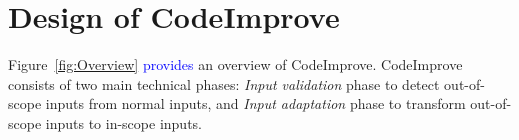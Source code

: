 \section{Design of CodeImprove}






Figure~\ref{fig:Overview} \textcolor{blue}{provides} an overview of CodeImprove. 
CodeImprove consists of two main technical phases: \textit{Input validation} phase to detect out-of-scope inputs from normal inputs, and \textit{Input adaptation} phase to transform out-of-scope inputs to in-scope inputs. %










